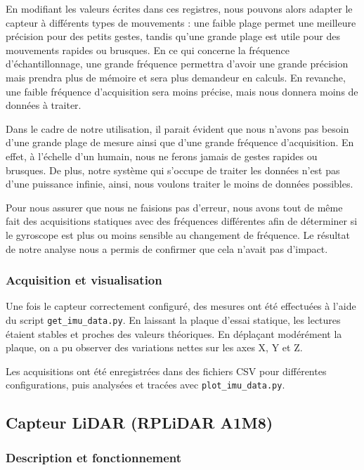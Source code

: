En modifiant les valeurs écrites dans ces registres, nous pouvons alors adapter le capteur à différents types de mouvements : une faible plage permet une meilleure précision pour des petits gestes, tandis qu’une grande plage est utile pour des mouvements rapides ou brusques. En ce qui concerne la fréquence d'échantillonnage, une grande fréquence permettra d'avoir une grande précision mais prendra plus de mémoire et sera plus demandeur en calculs. En revanche, une faible fréquence d'acquisition sera moins précise, mais nous donnera moins de données à traiter.

Dans le cadre de notre utilisation, il parait évident que nous n'avons pas besoin d'une grande plage de mesure ainsi que d'une grande fréquence d'acquisition. En effet, à l'échelle d'un humain, nous ne ferons jamais de gestes rapides ou brusques. De plus, notre système qui s'occupe de traiter les données n'est pas d'une puissance infinie, ainsi, nous voulons traiter le moins de données possibles.

Pour nous assurer que nous ne faisions pas d'erreur, nous avons tout de même fait des acquisitions statiques avec des fréquences différentes afin de déterminer si le gyroscope est plus ou moins sensible au changement de fréquence. Le résultat de notre analyse nous a permis de confirmer que cela n'avait pas d'impact.


\vspace{1em}
\subsubsection*{Acquisition et visualisation}

Une fois le capteur correctement configuré, des mesures ont été effectuées à l’aide du script \texttt{get\_imu\_data.py}. En laissant la plaque d’essai statique, les lectures étaient stables et proches des valeurs théoriques. En déplaçant modérément la plaque, on a pu observer des variations nettes sur les axes X, Y et Z.

Les acquisitions ont été enregistrées dans des fichiers CSV pour différentes configurations, puis analysées et tracées avec \texttt{plot\_imu\_data.py}.

\subsection{Capteur LiDAR (RPLiDAR A1M8)}

\subsubsection*{Description et fonctionnement}

